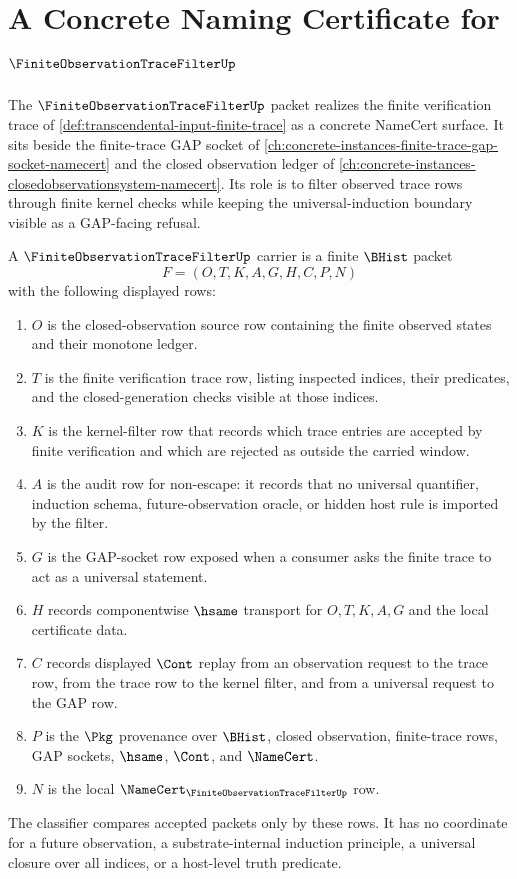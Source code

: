 \chapter{A Concrete Naming Certificate for $\FiniteObservationTraceFilterUp$}
\label{ch:concrete-instances-finite-observation-trace-filter-namecert}

The $\FiniteObservationTraceFilterUp$ packet realizes the finite verification
trace of \autoref{def:transcendental-input-finite-trace} as a concrete
NameCert surface. It sits beside the finite-trace GAP socket of
\autoref{ch:concrete-instances-finite-trace-gap-socket-namecert} and the
closed observation ledger of
\autoref{ch:concrete-instances-closedobservationsystem-namecert}. Its role is
to filter observed trace rows through finite kernel checks while keeping the
universal-induction boundary visible as a GAP-facing refusal.

\begin{definition}
\label{def:finite-observation-trace-filter-carrier}
A $\FiniteObservationTraceFilterUp$ carrier is a finite $\BHist$ packet
$$
F=(O,T,K,A,G,H,C,P,N)
$$
with the following displayed rows:
\begin{enumerate}
\item $O$ is the closed-observation source row containing the finite observed
states and their monotone ledger.
\item $T$ is the finite verification trace row, listing inspected indices,
their predicates, and the closed-generation checks visible at those indices.
\item $K$ is the kernel-filter row that records which trace entries are
accepted by finite verification and which are rejected as outside the carried
window.
\item $A$ is the audit row for non-escape: it records that no universal
quantifier, induction schema, future-observation oracle, or hidden host rule is
imported by the filter.
\item $G$ is the GAP-socket row exposed when a consumer asks the finite trace
to act as a universal statement.
\item $H$ records componentwise $\hsame$ transport for $O,T,K,A,G$ and the
local certificate data.
\item $C$ records displayed $\Cont$ replay from an observation request to the
trace row, from the trace row to the kernel filter, and from a universal
request to the GAP row.
\item $P$ is the $\Pkg$ provenance over $\BHist$, closed observation,
finite-trace rows, GAP sockets, $\hsame$, $\Cont$, and $\NameCert$.
\item $N$ is the local $\NameCert_{\FiniteObservationTraceFilterUp}$ row.
\end{enumerate}
The classifier compares accepted packets only by these rows. It has no
coordinate for a future observation, a substrate-internal induction principle,
a universal closure over all indices, or a host-level truth predicate.
\end{definition}

